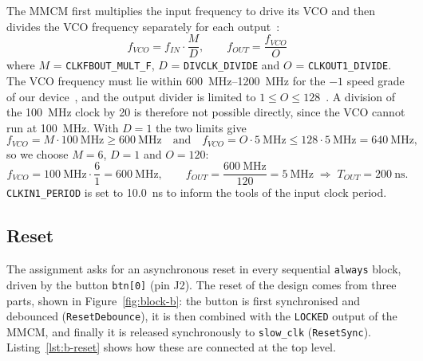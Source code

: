 \documentclass{article}
\begin{document}
The MMCM first multiplies the input frequency to drive its VCO and then divides
the VCO frequency separately for each output~\cite[Eq.~3-1, 3-2]{ug472}:
\begin{equation}
  f_{VCO} = f_{IN} \cdot \frac{M}{D}, \qquad
  f_{OUT} = \frac{f_{VCO}}{O}
\end{equation}
where $M$ = \texttt{CLKFBOUT\_MULT\_F}, $D$ = \texttt{DIVCLK\_DIVIDE} and
$O$ = \texttt{CLKOUT1\_DIVIDE}. The VCO frequency must lie within
\SIrange{600}{1200}{\mega\hertz} for the $-1$ speed grade of our
device~\cite[Table~37: MMCM Specification]{ds189}, and the output divider is
limited to $1 \le O \le 128$~\cite[MMCME2\_BASE]{ug953}. A division of the
\SI{100}{\mega\hertz} clock by 20 is therefore not possible directly, since the
VCO cannot run at \SI{100}{\mega\hertz}. With $D = 1$ the two limits give
\begin{equation}
  f_{VCO} = M \cdot \SI{100}{\mega\hertz} \ge \SI{600}{\mega\hertz}
  \quad\text{and}\quad
  f_{VCO} = O \cdot \SI{5}{\mega\hertz} \le 128 \cdot \SI{5}{\mega\hertz} = \SI{640}{\mega\hertz},
\end{equation}
so we choose $M = 6$, $D = 1$ and $O = 120$:
\begin{equation}
  f_{VCO} = \SI{100}{\mega\hertz} \cdot \frac{6}{1} = \SI{600}{\mega\hertz},
  \qquad
  f_{OUT} = \frac{\SI{600}{\mega\hertz}}{120} = \SI{5}{\mega\hertz}
  \;\Rightarrow\; T_{OUT} = \SI{200}{\nano\second}.
\end{equation}
\texttt{CLKIN1\_PERIOD} is set to \SI{10.0}{\nano\second} to inform the tools
of the input clock period.

\subsection{Reset}
\label{sec:b-reset}
The assignment asks for an asynchronous reset in every sequential \texttt{always}
block, driven by the button \texttt{btn[0]} (pin J2). The reset of the design
comes from three parts, shown in Figure~\ref{fig:block-b}: the button is first
synchronised and debounced (\texttt{ResetDebounce}), it is then combined with the
\texttt{LOCKED} output of the MMCM, and finally it is released synchronously to
\texttt{slow\_clk} (\texttt{ResetSync}). Listing~\ref{lst:b-reset} shows how these are connected at the top level.


\end{document}
